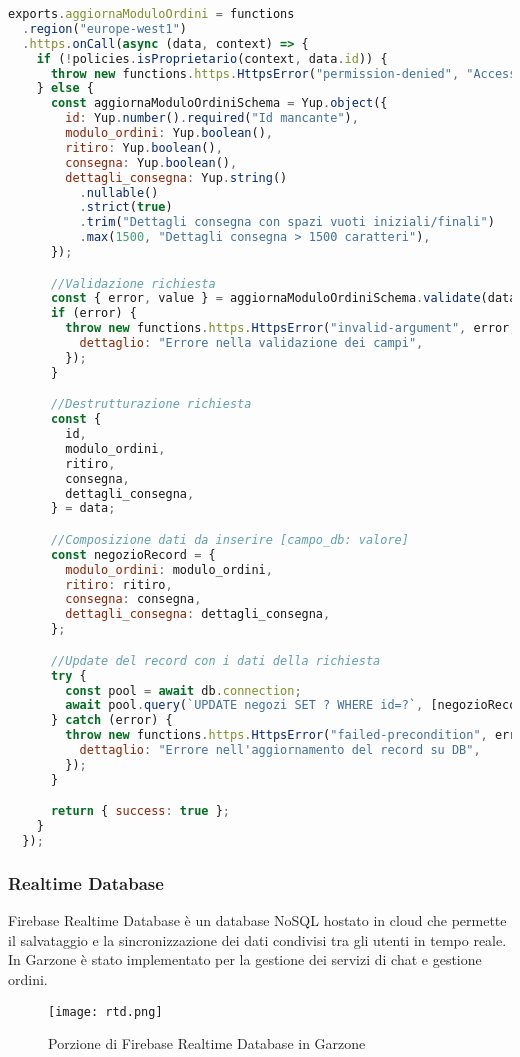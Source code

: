 \begin{lstlisting}[language=JavaScript]
    exports.aggiornaModuloOrdini = functions
  .region("europe-west1")
  .https.onCall(async (data, context) => {
    if (!policies.isProprietario(context, data.id)) {
      throw new functions.https.HttpsError("permission-denied", "Accesso negato");
    } else {
      const aggiornaModuloOrdiniSchema = Yup.object({
        id: Yup.number().required("Id mancante"),
        modulo_ordini: Yup.boolean(),
        ritiro: Yup.boolean(),
        consegna: Yup.boolean(),
        dettagli_consegna: Yup.string()
          .nullable()
          .strict(true)
          .trim("Dettagli consegna con spazi vuoti iniziali/finali")
          .max(1500, "Dettagli consegna > 1500 caratteri"),
      });

      //Validazione richiesta
      const { error, value } = aggiornaModuloOrdiniSchema.validate(data);
      if (error) {
        throw new functions.https.HttpsError("invalid-argument", error, {
          dettaglio: "Errore nella validazione dei campi",
        });
      }

      //Destrutturazione richiesta
      const {
        id,
        modulo_ordini,
        ritiro,
        consegna,
        dettagli_consegna,
      } = data;

      //Composizione dati da inserire [campo_db: valore]
      const negozioRecord = {
        modulo_ordini: modulo_ordini,
        ritiro: ritiro,
        consegna: consegna,
        dettagli_consegna: dettagli_consegna,
      };

      //Update del record con i dati della richiesta
      try {
        const pool = await db.connection;
        await pool.query(`UPDATE negozi SET ? WHERE id=?`, [negozioRecord, id]);
      } catch (error) {
        throw new functions.https.HttpsError("failed-precondition", error, {
          dettaglio: "Errore nell'aggiornamento del record su DB",
        });
      }

      return { success: true };
    }
  });
\end{lstlisting}
\newpage
\subsubsection{Realtime Database}
Firebase Realtime Database è un database NoSQL hostato in cloud che permette il salvataggio e la sincronizzazione dei dati condivisi tra gli utenti in tempo reale. In Garzone è stato implementato per la gestione dei servizi di chat e gestione ordini. 
\begin{figure}[h!]
    \centering
    \texttt{[image: rtd.png]}
    \caption{Porzione di Firebase Realtime Database in Garzone}
\end{figure}
\FloatBarrier
